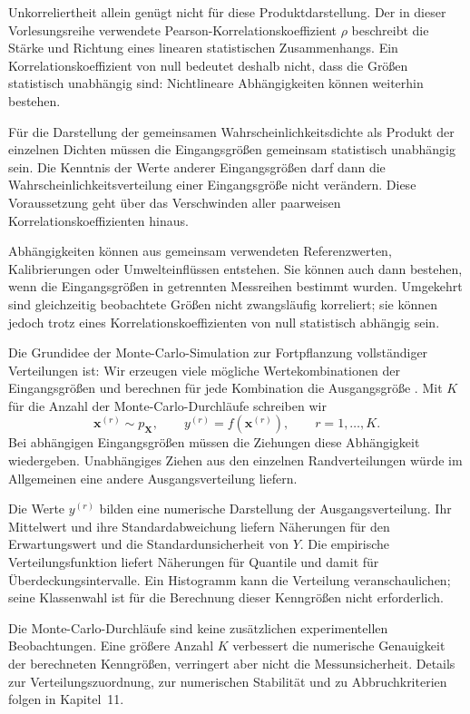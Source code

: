 Unkorreliertheit allein genügt nicht für diese Produktdarstellung.
Der in dieser Vorlesungsreihe verwendete Pearson-Korre\-la\-tions\-koeffizient $\rho$ beschreibt die
Stärke und Richtung eines linearen statistischen Zusammenhangs.
Ein Korrelationskoeffizient von null bedeutet deshalb nicht, dass
die Größen statistisch unabhängig sind: Nichtlineare Abhängigkeiten
können weiterhin bestehen.

Für die Darstellung der gemeinsamen Wahrscheinlichkeitsdichte als
Produkt der einzelnen Dichten müssen die Eingangsgrößen gemeinsam
statistisch unabhängig sein. Die Kenntnis der Werte anderer
Eingangsgrößen darf dann die Wahrscheinlichkeitsverteilung einer
Eingangsgröße nicht verändern. Diese Voraussetzung geht über das
Verschwinden aller paarweisen Korrelationskoeffizienten hinaus.

Abhängigkeiten können aus gemeinsam verwendeten Referenzwerten,
Kalibrierungen oder Umwelteinflüssen entstehen. Sie können auch dann
bestehen, wenn die Eingangsgrößen in getrennten Messreihen bestimmt
wurden. Umgekehrt sind gleichzeitig beobachtete Größen nicht
zwangsläufig korreliert; sie können jedoch trotz eines
Korrelationskoeffizienten von null statistisch abhängig sein.

Die Grundidee der Monte-Carlo-Simulation zur Fortpflanzung vollständiger Verteilungen ist: Wir erzeugen viele mögliche Wertekombinationen
der Eingangsgrößen und berechnen für jede Kombination die Ausgangsgröße \cite{Cox06}. Mit $K$ für die Anzahl der Monte-Carlo-Durchläufe schreiben wir
\begin{equation}
\mathbf x^{(r)}\sim p_{\mathbf X},\qquad
y^{(r)}=f(\mathbf x^{(r)}),\qquad r=1,\dots,K.
\end{equation}
Bei abhängigen Eingangsgrößen müssen die Ziehungen diese Abhängigkeit
wiedergeben. Unabhängiges Ziehen aus den einzelnen Randverteilungen würde
im Allgemeinen eine andere Ausgangsverteilung liefern.

Die Werte $y^{(r)}$ bilden eine numerische Darstellung der Ausgangsverteilung.
Ihr Mittelwert und ihre Standardabweichung liefern Näherungen für den
Erwartungswert und die Standardunsicherheit von $Y$. Die empirische
Verteilungsfunktion liefert Näherungen für Quantile und damit für
Überdeckungsintervalle. Ein Histogramm kann die Verteilung veranschaulichen;
seine Klassenwahl ist für die Berechnung dieser Kenngrößen nicht erforderlich.

Die Monte-Carlo-Durchläufe sind keine zusätzlichen experimentellen
Beobachtungen. Eine größere Anzahl $K$ verbessert die numerische Genauigkeit
der berechneten Kenngrößen, verringert aber nicht die Messunsicherheit.
Details zur Verteilungszuordnung, zur numerischen Stabilität und zu
Abbruchkriterien folgen in Kapitel~11.\\

